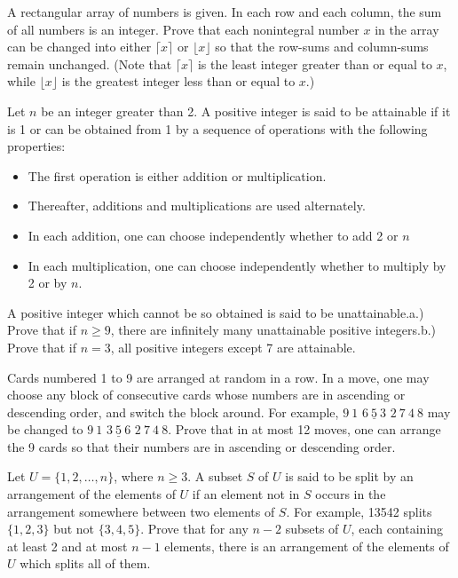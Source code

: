 \item[\textbf{C1.}]A rectangular array of numbers is given. In each row and each column, the sum of all numbers is an integer. Prove that each nonintegral number $x$ in the array can be changed into either $\lceil x\rceil $ or $\lfloor x\rfloor $ so that the row-sums and column-sums remain unchanged. (Note that $\lceil x\rceil $ is the least integer greater than or equal to $x$,  while $\lfloor x\rfloor $ is the greatest integer less than or equal to $x$.)

\item[\textbf{C2.}]Let $n$ be an integer greater than 2. A positive integer is said to be attainable if it is 1 or can be obtained from 1 by a sequence of operations with the following properties:

\begin{itemize}
\item  The first operation is either addition or multiplication.
\item Thereafter, additions and multiplications are used alternately.
\item  In each addition, one can choose independently whether to add 2 or $n$
\item  In each multiplication, one can choose independently whether to multiply by 2 or by $n$.
\end{itemize}
A positive integer which cannot be so obtained is said to be unattainable.a.)  Prove that if $n\geq 9$,  there are infinitely many unattainable positive integers.b.)  Prove that if $n=3$,  all positive integers except 7 are attainable.

\item[\textbf{C3.}]Cards numbered 1 to 9 are arranged at random in a row. In a move, one may choose any block of consecutive cards whose numbers are in ascending or descending order, and switch the block around. For example, $9\ 1$ $\underline{6\ 5\ 3}$ $2\ 7\ 4\ 8$ may be changed to $9\ 1$ $\underline{3\ 5\ 6}$ $2\ 7\ 4\ 8$. Prove that in at most 12 moves, one can arrange the 9 cards so that their numbers are in ascending or descending order.

\item[\textbf{C4.}]Let $U=\{1,2,\ldots ,n\}$,  where $n\geq 3$. A subset $S$ of $U$ is said to be split by an arrangement of the elements of $U$ if an element not in $S$ occurs in the arrangement somewhere between two elements of $S$. For example, 13542 splits $\{1,2,3\}$ but not $\{3,4,5\}$. Prove that for any $n-2$ subsets of $U$,  each containing at least 2 and at most $n-1$ elements, there is an arrangement of the elements of $U$ which splits all of them.

